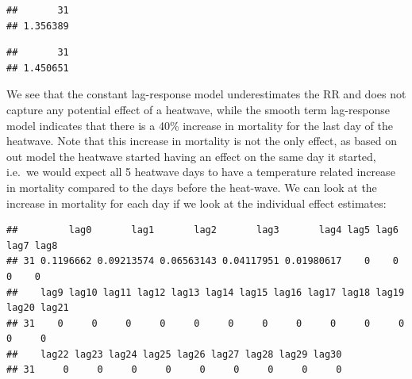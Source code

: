 \documentclass[
]{book}
\newenvironment{Shaded}{\begin{snugshade}}{\end{snugshade}}
\newcommand{\DocumentationTok}[1]{\textcolor[rgb]{0.56,0.35,0.01}{\textbf{\textit{#1}}}}
\newcommand{\NormalTok}[1]{#1}
\newcommand{\SpecialCharTok}[1]{\textcolor[rgb]{0.00,0.00,0.00}{#1}}
\begin{document}
\begin{verbatim}
##       31 
## 1.356389
\end{verbatim}

\begin{Shaded}
\end{Shaded}

\begin{verbatim}
##       31 
## 1.450651
\end{verbatim}

We see that the constant lag-response model underestimates the RR and does not capture any potential effect of a heatwave, while the smooth term lag-response model indicates that there is a 40\% increase in mortality for the last day of the heatwave. Note that this increase in mortality is not the only effect, as based on out model the heatwave started having an effect on the same day it started, i.e.~we would expect all 5 heatwave days to have a temperature related increase in mortality compared to the days before the heat-wave. We can look at the increase in mortality for each day if we look at the individual effect estimates:

\begin{Shaded}
\end{Shaded}

\begin{verbatim}
##         lag0       lag1       lag2       lag3       lag4 lag5 lag6 lag7 lag8
## 31 0.1196662 0.09213574 0.06563143 0.04117951 0.01980617    0    0    0    0
##    lag9 lag10 lag11 lag12 lag13 lag14 lag15 lag16 lag17 lag18 lag19 lag20 lag21
## 31    0     0     0     0     0     0     0     0     0     0     0     0     0
##    lag22 lag23 lag24 lag25 lag26 lag27 lag28 lag29 lag30
## 31     0     0     0     0     0     0     0     0     0
\end{verbatim}

\begin{Shaded}
\end{Shaded}
\end{document}
